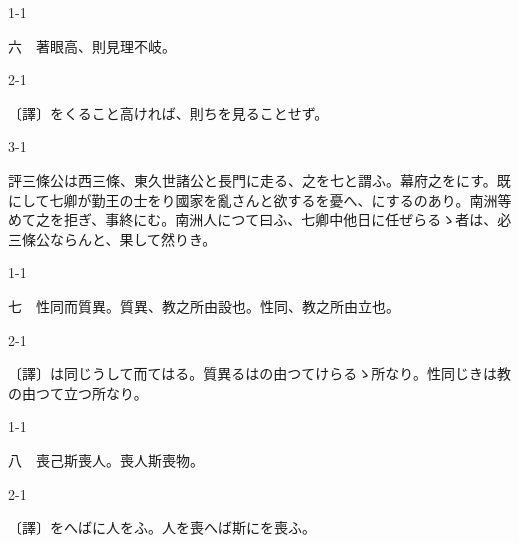\documentclass[tate,paper=b6j,jafontsize=9pt]{jlreq}
\begin{document}
\begin{azconvIndented}{1\zw}{-1\zw}

六　著眼高、則見理不岐。

\end{azconvIndented}
\begin{azconvIndented}{2\zw}{-1\zw}

〔譯〕をくること高ければ、則ちを見ることせず。

\end{azconvIndented}
\begin{azconvIndented}{3\zw}{-1\zw}

評三條公は西三條、東久世諸公と長門に走る、之を七と謂ふ。幕府之をにす。既にして七卿が勤王の士をり國家を亂さんと欲するを憂へ、にするのあり。南洲等めて之を拒ぎ、事終にむ。南洲人につて曰ふ、七卿中他日に任ぜらるゝ者は、必三條公ならんと、果して然りき。

\end{azconvIndented}

\begin{azconvIndented}{1\zw}{-1\zw}

七　性同而質異。質異、教之所由設也。性同、教之所由立也。

\end{azconvIndented}
\begin{azconvIndented}{2\zw}{-1\zw}

〔譯〕は同じうして而てはる。質異るはの由つてけらるゝ所なり。性同じきは教の由つて立つ所なり。

\end{azconvIndented}

\begin{azconvIndented}{1\zw}{-1\zw}

八　喪己斯喪人。喪人斯喪物。

\end{azconvIndented}
\begin{azconvIndented}{2\zw}{-1\zw}

〔譯〕をへばに人をふ。人を喪へば斯にを喪ふ。

\end{azconvIndented}
\end{document}

